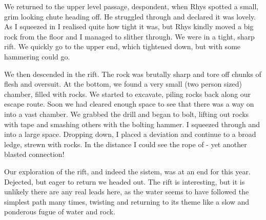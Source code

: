 We returned to the upper level passage, despondent, when Rhys spotted a small, grim looking chute heading off. He struggled through and declared it was lovely. As I squeezed in I realised quite how tight it was, but Rhys kindly moved a big rock from the floor and I managed to slither through. We were in a tight, sharp rift. We quickly go to the upper end, which tightened down, but with some hammering could go. 
 
We then descended in the rift. The rock was brutally sharp and tore off chunks of flesh and oversuit. At the bottom, we found a very small (two person sized) chamber, filled with rocks. We started to excavate, piling rocks back along our escape route. Soon we had cleared enough space to see that there was a way on into a vast chamber. We grabbed the drill and began to bolt, lifting out rocks with tape and smashing others with the bolting hammer. I squeezed through and into a large space. Dropping down, I placed a deviation and continue to a broad ledge, strewn with rocks. In the distance I could see the rope of  - yet another blasted connection!
 
Our exploration of the rift, and indeed the sistem, was at an end for this year. Dejected, but eager to return we headed out. The rift is interesting, but it is unlikely there are any real leads here, as the water seems to have followed the simplest path many times, twisting and returning to its theme like a slow and ponderous fugue of water and rock.

